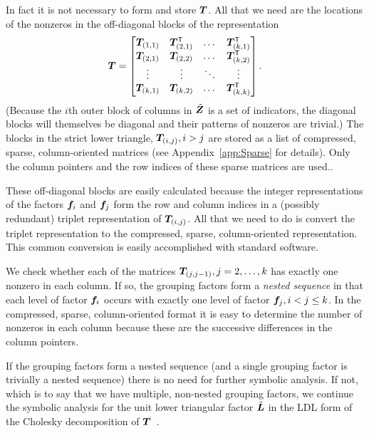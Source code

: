 \documentclass[12pt]{article}
\begin{document}
In fact it is not necessary to form and store $\bm{T}$.  All that we need
are the locations of the nonzeros in the off-diagonal blocks of the
representation
\begin{equation}
  \label{eq:PairwiseCrosstab}
  \bm{T}=\begin{bmatrix}
    \bm{T}_{(1,1)}&\bm{T}_{(2,1)}^\mathsf{T}&\dots&\bm{T}_{(k,1)}^\mathsf{T}\\
    \bm{T}_{(2,1)}&\bm{T}_{(2,2)}&\dots&\bm{T}_{(k,2)}^\mathsf{T}\\
    \vdots&\vdots&\ddots&\vdots\\
    \bm{T}_{(k,1)}&\bm{T}_{(k,2)}&\dots&\bm{T}_{(k,k)}^\mathsf{T}
  \end{bmatrix} .
\end{equation}
(Because the $i$th outer block of columns in $\tilde{\bm{Z}}$ is a set of
indicators, the diagonal blocks will themselves be diagonal and their
patterns of nonzeros are trivial.)  The blocks in the strict lower
triangle, $\bm{T}_{(i,j)}, i>j$ are stored as a list of compressed,
sparse, column-oriented matrices (see Appendix~\ref{app:Sparse} for
details).  Only the column pointers and the row indices of these
sparse matrices are used..

These off-diagonal blocks are easily calculated because the integer
representations of the factors $\bm{f}_i$ and $\bm{f}_j$ form the row and
column indices in a (possibly redundant) triplet representation of
$\bm{T}_{(i,j)}$.  All that we need to do is convert the triplet
representation to the compressed, sparse, column-oriented
representation.  This common conversion is easily accomplished with
standard software.

We check whether each of the matrices $\bm{T}_{(j,j-1)},j=2,\dots,k$ has
exactly one nonzero in each column.  If so, the grouping factors form
a \emph{nested sequence} in that each level of factor $\bm{f}_i$ occurs
with exactly one level of factor $\bm{f}_j, i<j\le k$.  In the
compressed, sparse, column-oriented format it is easy to determine the
number of nonzeros in each column because these are the successive
differences in the column pointers.

If the grouping factors form a nested sequence (and a single grouping
factor is trivially a nested sequence) there is no need for further
symbolic analysis.  If not, which is to say that we have multiple,
non-nested grouping factors, we continue the symbolic analysis for the
unit lower triangular factor $\tilde{\bm{L}}$ in the LDL form of the Cholesky
decomposition of $\bm{T}$~\citep{Davis:2004}.
\end{document}
